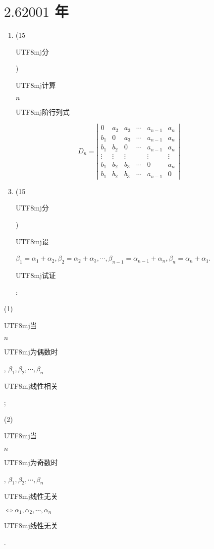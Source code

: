 \documentclass[10pt]{article}
\begin{document}
\section{$2.62001$ 年}
\begin{enumerate}
  \item (15 \begin{CJK}{UTF8}{mj}分\end{CJK}) \begin{CJK}{UTF8}{mj}计算\end{CJK} $n$ \begin{CJK}{UTF8}{mj}阶行列式\end{CJK}
\end{enumerate}
$$
D_{n}=\left|\begin{array}{cccccc}
0 & a_{2} & a_{3} & \cdots & a_{n-1} & a_{n} \\
b_{1} & 0 & a_{3} & \cdots & a_{n-1} & a_{n} \\
b_{1} & b_{2} & 0 & \cdots & a_{n-1} & a_{n} \\
\vdots & \vdots & \vdots & & \vdots & \vdots \\
b_{1} & b_{2} & b_{3} & \cdots & 0 & a_{n} \\
b_{1} & b_{2} & b_{3} & \cdots & a_{n-1} & 0
\end{array}\right|
$$

\begin{enumerate}
  \setcounter{enumi}{2}
  \item (15 \begin{CJK}{UTF8}{mj}分\end{CJK}) \begin{CJK}{UTF8}{mj}设\end{CJK} $\beta_{1}=\alpha_{1}+\alpha_{2}, \beta_{2}=\alpha_{2}+\alpha_{3}, \cdots, \beta_{n-1}=\alpha_{n-1}+\alpha_{n}, \beta_{n}=\alpha_{n}+\alpha_{1}$. \begin{CJK}{UTF8}{mj}试证\end{CJK}:
\end{enumerate}
(1) \begin{CJK}{UTF8}{mj}当\end{CJK} $n$ \begin{CJK}{UTF8}{mj}为偶数时\end{CJK}, $\beta_{1}, \beta_{2}, \cdots, \beta_{n}$ \begin{CJK}{UTF8}{mj}线性相关\end{CJK};

(2) \begin{CJK}{UTF8}{mj}当\end{CJK} $n$ \begin{CJK}{UTF8}{mj}为奇数时\end{CJK}, $\beta_{1}, \beta_{2}, \cdots, \beta_{n}$ \begin{CJK}{UTF8}{mj}线性无关\end{CJK} $\Leftrightarrow \alpha_{1}, \alpha_{2}, \cdots, \alpha_{n}$ \begin{CJK}{UTF8}{mj}线性无关\end{CJK}.
\end{document}
